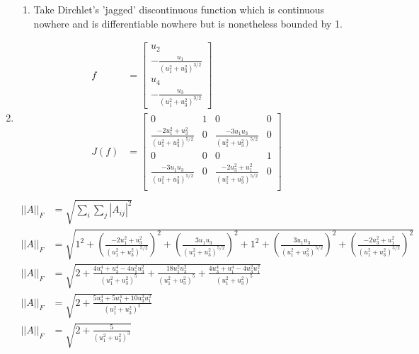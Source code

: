 \documentclass{article}
\begin{document}
\begin{enumerate}
\begin{enumerate}
\item
Take Dirchlet's 'jagged' discontinuous function which is continuous nowhere and is differentiable nowhere but is nonetheless bounded by 1.
\end{enumerate}
\item
\begin{equation*}
\begin{split}
f  &=
\begin{bmatrix}
u_{2} \\
-\frac{u_{1}}{(u_{1}^{2}+u_{3}^{2})^{3/2}} \\
u_{4}  \\
-\frac{u_{3}}{(u_{1}^{2}+u_{3}^{2})^{3/2}}
\end{bmatrix} \\
J(f) &= \begin{bmatrix}
0 & 1 & 0 & 0 \\
\frac{-2u_{1}^{2}+u_{3}^{2}}{(u_{1}^{2}+u_{3}^{2})^{5/2}} & 0 & \frac{-3u_{1}u_{3}}{(u_{1}^{2}+u_{3}^{2})^{5/2}} & 0 \\
0 & 0 & 0 & 1 \\
 \frac{-3u_{1}u_{3}}{(u_{1}^{2}+u_{3}^{2})^{5/2}} & 0 & \frac{-2u_{3}^{2}+u_{1}^{2}}{(u_{1}^{2}+u_{3}^{2})^{5/2}} & 0 \\
\end{bmatrix} \\
\end{split}
\end{equation*}
\begin{equation*}
\begin{split}
\left|\left| A\right|\right|_{F} & = \sqrt{\sum_{i}\sum_{j} \left| A_{ij} \right |^{2} } \\
\left|\left| A\right|\right|_{F} & = \sqrt{ 1^{2} + (\frac{-2u_{1}^{2}+u_{3}^{2}}{(u_{1}^{2}+u_{3}^{2})^{5/2}})^{2}+(\frac{3u_{1}u_{3}}{(u_{1}^{2}+u_{3}^{2})^{5/2}})^{2}+1^{2} +( \frac{3u_{1}u_{3}}{(u_{1}^{2}+u_{3}^{2})^{5/2}})^{2}+(\frac{-2u_{3}^{2}+u_{1}^{2}}{(u_{1}^{2}+u_{3}^{2})^{5/2}})^{2}}\\
\left|\left| A\right|\right|_{F} & = \sqrt{ 2 + \frac{4u_{1}^{4}+u_{3}^{4}-4u_{1}^{2}u_{3}^{2}}{(u_{1}^{2}+u_{3}^{2})^{5}}+\frac{18u_{1}^{2}u_{3}^{2}}{(u_{1}^{2}+u_{3}^{2})^{5}} +\frac{4u_{3}^{4}+u_{1}^{4}-4u_{3}^{2}u_{1}^{2}}{(u_{1}^{2}+u_{3}^{2})^{5}}}\\
\left|\left| A\right|\right|_{F} & = \sqrt{ 2 + \frac{5u_{3}^{4}+5u_{1}^{4}+10u_{3}^{2}u_{1}^{2}}{(u_{1}^{2}+u_{3}^{2})^{5}}}\\
\left|\left| A\right|\right|_{F} & = \sqrt{ 2 + \frac{5}{(u_{1}^{2}+u_{3}^{2})^{3}}}\\

\end{split}
\end{equation*}
\end{enumerate}
\end{document}
